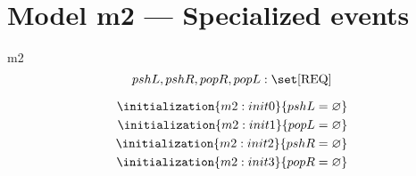 \documentclass[12pt]{amsart}
\newcommand{\REQ}{\text{REQ}}
\begin{document}
\section{Model m2 --- Specialized events}
\begin{machine}{m2}
  \[ \variable{pshL,pshR,popR,popL : \set [\REQ]} \]
  \begin{description}
  \end{description}
  \begin{align}
    \initialization{m2:init0}{pshL = \emptyset} \\
    \initialization{m2:init1}{popL = \emptyset} \\
    \initialization{m2:init2}{pshR = \emptyset} \\
    \initialization{m2:init3}{popR = \emptyset} 
  \end{align}

\end{machine}
\end{document}
